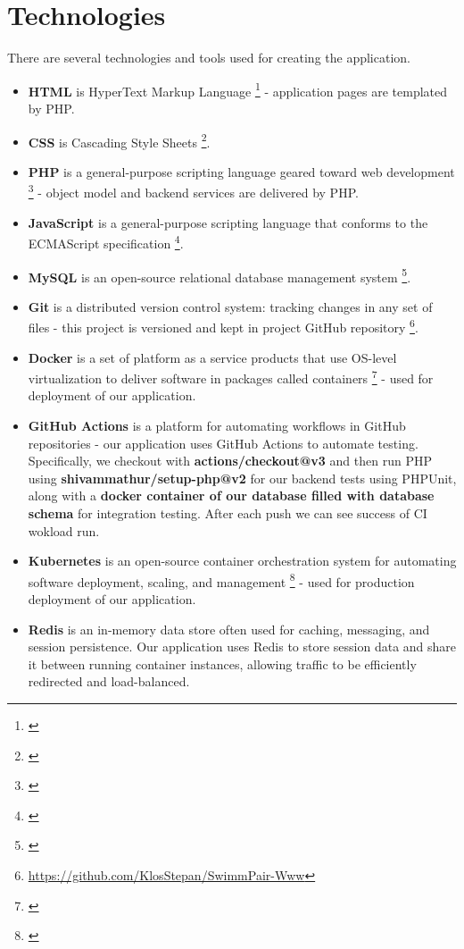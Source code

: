 \section{Technologies}
There are several technologies and tools used for creating the application.
\begin{itemize}
    \item \textbf{HTML} is HyperText Markup Language \footnote{\citep{HTML5Standard}} - application pages are templated by PHP.
    \item \textbf{CSS} is Cascading Style Sheets \footnote{\citep{CSS3Standard}}.
    \item \textbf{PHP} is a general-purpose scripting language geared toward web development \footnote{\citep{PHP74Standard}} - object model and backend services are delivered by PHP.
    \item \textbf{JavaScript}  is a general-purpose scripting language that conforms to the ECMAScript specification \footnote{\citep{ECMADocu}}.
    \item \textbf{MySQL} is an open-source relational database management system \footnote{\citep{MySQLDocu}}.
    \item \textbf{Git} is a distributed version control system: tracking changes in any set of files - this project is versioned and kept in project GitHub repository \footnote{\url{https://github.com/KlosStepan/SwimmPair-Www}}.
    \item \textbf{Docker} is a set of platform as a service products that use OS-level virtualization to deliver software in packages called containers \footnote{\citep{DockerDocu}} - used for deployment of our application.
    \item \textbf{GitHub Actions} is a platform for automating workflows in GitHub repositories - our application uses GitHub Actions to automate testing. Specifically, we checkout with \textbf{actions/checkout@v3} and then run PHP using \textbf{shivammathur/setup-php@v2} for our backend tests using PHPUnit, along with a \textbf{docker container of our database filled with database schema} for integration testing. After each push we can see success of CI wokload run.
    \item \textbf{Kubernetes} is an open-source container orchestration system for automating software deployment, scaling, and management \footnote{\citep{K8sDocu}} - used for production deployment of our application.
    \item \textbf{Redis} is an in-memory data store often used for caching, messaging, and session persistence. Our application uses Redis to store session data and share it between running container instances, allowing traffic to be efficiently redirected and load-balanced.
\end{itemize} 
\newpage
